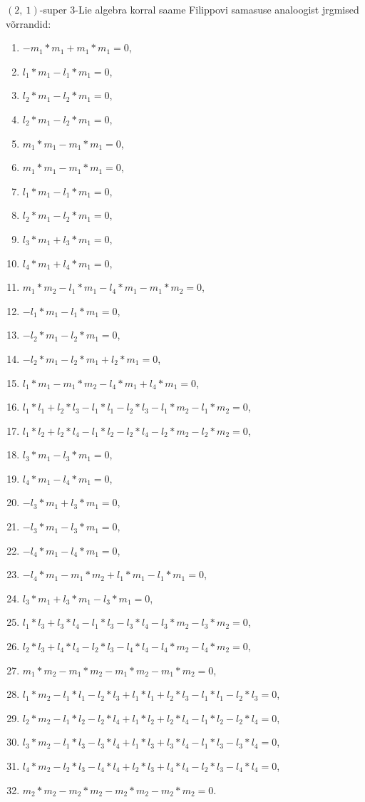 $(2,\ 1)$-super $3$-Lie algebra korral saame Filippovi samasuse analoogist jrgmised võrrandid:
\begin{enumerate}
    \item $-m_1*m_1 + m_1*m_1 = 0$,
    \item $l_1*m_1 - l_1*m_1 = 0$,
    \item $l_2*m_1 - l_2*m_1 = 0$,
    \item $l_2*m_1 - l_2*m_1 = 0$,
    \item $m_1*m_1 - m_1*m_1 = 0$,
    \item $m_1*m_1 - m_1*m_1 = 0$,
    \item $l_1*m_1 - l_1*m_1 = 0$,
    \item $l_2*m_1 - l_2*m_1 = 0$,
    \item $l_3*m_1 + l_3*m_1 = 0$,
    \item $l_4*m_1 + l_4*m_1 = 0$,
    \item $m_1*m_2 - l_1*m_1 - l_4*m_1 - m_1*m_2 = 0$,
    \item $-l_1*m_1 - l_1*m_1 = 0$,
    \item $-l_2*m_1 - l_2*m_1 = 0$,
    \item $-l_2*m_1 - l_2*m_1 + l_2*m_1 = 0$,
    \item $l_1*m_1 - m_1*m_2 - l_4*m_1 + l_4*m_1 = 0$,
    \item $l_1*l_1 + l_2*l_3 - l_1*l_1 - l_2*l_3 - l_1*m_2 - l_1*m_2 = 0$,
    \item $l_1*l_2 + l_2*l_4 - l_1*l_2 - l_2*l_4 - l_2*m_2 - l_2*m_2 = 0$,
    \item $l_3*m_1 - l_3*m_1 = 0$,
    \item $l_4*m_1 - l_4*m_1 = 0$,
    \item $-l_3*m_1 + l_3*m_1 = 0$,
    \item $-l_3*m_1 - l_3*m_1 = 0$,
    \item $-l_4*m_1 - l_4*m_1 = 0$,
    \item $-l_4*m_1 - m_1*m_2 + l_1*m_1 - l_1*m_1 = 0$,
    \item $l_3*m_1 + l_3*m_1 - l_3*m_1 = 0$,
    \item $l_1*l_3 + l_3*l_4 - l_1*l_3 - l_3*l_4 - l_3*m_2 - l_3*m_2 = 0$,
    \item $l_2*l_3 + l_4*l_4 - l_2*l_3 - l_4*l_4 - l_4*m_2 - l_4*m_2 = 0$,
    \item $m_1*m_2 - m_1*m_2 - m_1*m_2 - m_1*m_2 = 0$,
    \item $l_1*m_2 - l_1*l_1 - l_2*l_3 + l_1*l_1 + l_2*l_3 - l_1*l_1 - l_2*l_3 = 0$,
    \item $l_2*m_2 - l_1*l_2 - l_2*l_4 + l_1*l_2 + l_2*l_4 - l_1*l_2 - l_2*l_4 = 0$,
    \item $l_3*m_2 - l_1*l_3 - l_3*l_4 + l_1*l_3 + l_3*l_4 - l_1*l_3 - l_3*l_4 = 0$,
    \item $l_4*m_2 - l_2*l_3 - l_4*l_4 + l_2*l_3 + l_4*l_4 - l_2*l_3 - l_4*l_4 = 0$,
    \item $m_2*m_2 - m_2*m_2 - m_2*m_2 - m_2*m_2 = 0$.
\end{enumerate}

